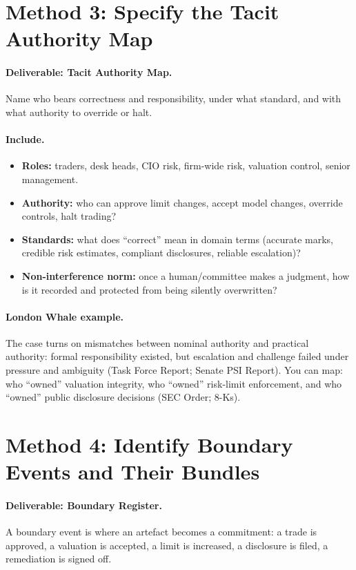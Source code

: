 \section{Method 3: Specify the Tacit Authority Map}
\label{sec:m3-authority}

\paragraph{Deliverable: Tacit Authority Map.}
Name who bears correctness and responsibility, under what standard, and with what authority to override or halt.

\paragraph{Include.}
\begin{itemize}
  \item \textbf{Roles:} traders, desk heads, CIO risk, firm-wide risk, valuation control, senior management.
  \item \textbf{Authority:} who can approve limit changes, accept model changes, override controls, halt trading?
  \item \textbf{Standards:} what does “correct” mean in domain terms (accurate marks, credible risk estimates,
        compliant disclosures, reliable escalation)?
  \item \textbf{Non-interference norm:} once a human/committee makes a judgment, how is it recorded and protected from being silently overwritten?
\end{itemize}

\paragraph{London Whale example.}
The case turns on mismatches between nominal authority and practical authority: formal responsibility existed,
but escalation and challenge failed under pressure and ambiguity (Task Force Report; Senate PSI Report).
You can map: who “owned” valuation integrity, who “owned” risk-limit enforcement, and who “owned” public disclosure decisions (SEC Order; 8-Ks).

\section{Method 4: Identify Boundary Events and Their Bundles}
\label{sec:m4-boundaries}

\paragraph{Deliverable: Boundary Register.}
A boundary event is where an artefact becomes a commitment: a trade is approved, a valuation is accepted,
a limit is increased, a disclosure is filed, a remediation is signed off.

